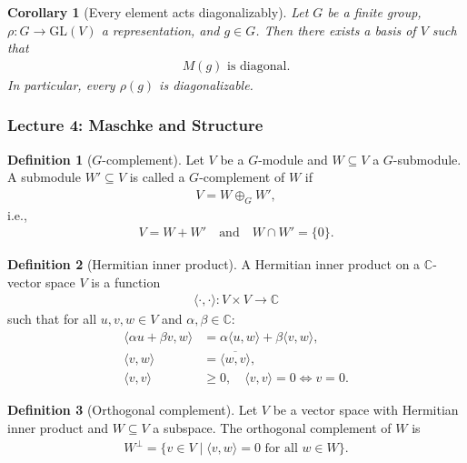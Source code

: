 \documentclass[titlepage]{article}
\theoremstyle{plain}
\newtheorem{corollary}[theorem]{Corollary}
\theoremstyle{definition}
\newtheorem{definition}{Definition}[section]
\theoremstyle{remark}
\theoremstyle{exercise-style}
\numberwithin{equation}{section}
\numberwithin{theorem}{section}
\numberwithin{remark}{section}
\begin{document}
\begin{corollary}[Every element acts diagonalizably]
Let $G$ be a finite group, $\rho: G \to \mathrm{GL}(V)$ a representation, and $g \in G$. Then there exists a basis of $V$ such that
\begin{align}
M(g) \text{ is diagonal}.
\end{align}
In particular, every $\rho(g)$ is diagonalizable.
\end{corollary}

\subsubsection{Lecture 4: Maschke and Structure}


\begin{definition}[$G$-complement]
Let $V$ be a $G$-module and $W \subseteq V$ a $G$-submodule. A submodule $W' \subseteq V$ is called a $G$-complement of $W$ if
\begin{align}
V = W \oplus_G W',
\end{align}
i.e.,
\begin{align}
V = W + W' \quad \text{and} \quad W \cap W' = \{0\}.
\end{align}
\end{definition}

\begin{definition}[Hermitian inner product]
A Hermitian inner product on a $\mathbb{C}$-vector space $V$ is a function
\begin{align}
\langle \cdot, \cdot \rangle : V \times V \to \mathbb{C}
\end{align}
such that for all $u,v,w \in V$ and $\alpha,\beta \in \mathbb{C}$:
\begin{align}
\langle \alpha u + \beta v, w \rangle &= \alpha \langle u, w \rangle + \beta \langle v, w \rangle, \\
\langle v, w \rangle &= \overline{\langle w, v \rangle}, \\
\langle v, v \rangle &\ge 0, \quad \langle v, v \rangle = 0 \iff v = 0.
\end{align}
\end{definition}

\begin{definition}[Orthogonal complement]
Let $V$ be a vector space with Hermitian inner product and $W \subseteq V$ a subspace. The orthogonal complement of $W$ is
\begin{align}
W^\perp = \{ v \in V \mid \langle v, w \rangle = 0 \text{ for all } w \in W \}.
\end{align}
\end{definition}
\end{document}
